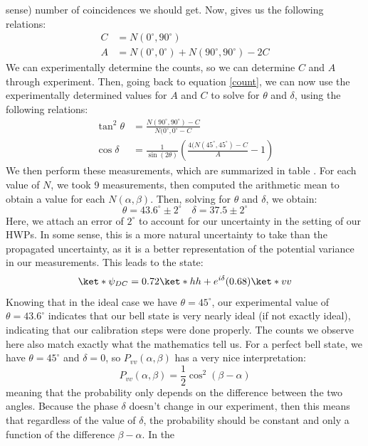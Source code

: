 \documentclass[10pt]{article}
\begin{document}
	sense) number of coincidences we should get. Now, \cite{dehlinger} gives us the following relations:
	\begin{align*}
		C &= N(0^{\circ}, 90^{\circ}) \\ 
		A &= N(0^{\circ}, 0^{\circ}) + N(90^{\circ}, 90^{\circ}) - 2C 
	\end{align*}
	We can experimentally determine the counts, so we can determine \( C \) and \( A \) through experiment.
	Then, going back to equation \ref{count}, we can now use the experimentally determined values for \( A \)
	and \( C \) to solve for \( \theta \) and \( \delta \), using the following relations:
	\begin{align*}
		\tan^2 \theta &= \frac{N(90^{\circ}, 90^{\circ}) - C}{N(0^{\circ}, 0 ^{\circ} - C}\\
		\cos \delta &= \frac{1}{\sin(2 \theta)}\left( \frac{4(N(45^{\circ}, 45^{\circ}) - C}{A} - 1 \right) 
	\end{align*}
	We then perform these measurements, which are summarized in table \cite{dehlinger}. For each value of \( N \), we
	took 9 measurements, then computed the arithmetic mean to obtain a value for each \( N(\alpha, \beta) \).
	Then, solving for \( \theta \) and \( \delta \), we obtain:
	\[
		\theta = 43.6^{\circ} \pm 2^{\circ} \quad \delta = 37.5 \pm 2^{\circ}
	\]
	Here, we attach an error of \( 2^{\circ} \) to account for our uncertainty in the setting of our HWPs.
	In some sense, this is a more natural uncertainty to take than the propagated uncertainty, as it is a
	better representation of the potential variance in our measurements. 
	This leads to the state:
	\[
		\ket*{\psi_{DC}} = 0.72 \ket*{hh} + e^{i \delta} (0.68) \ket*{vv}
	\]
	Knowing that in the ideal case we have \( \theta = 45^{\circ} \), our experimental value of \( \theta =
	43.6^{\circ} \) indicates that our bell state is very nearly ideal (if not exactly ideal), 
	indicating that our calibration steps were done properly. The counts we observe here also match exactly
	what the mathematics tell us. For a perfect bell state, we have \( \theta = 45^{\circ} \) and \( \delta = 0 \), 
	so \( P_{vv}(\alpha, \beta) \) has a very nice interpretation:
	\[
		P_{vv}(\alpha, \beta) = \frac{1}{2}\cos^2(\beta - \alpha)
	\]
	meaning that the probability only depends on the difference between the two angles. Because the phase
	\( \delta \) doesn't change in our experiment, then this means that regardless of the value of \( \delta \),
	the probability should be constant and only a function of the difference \( \beta - \alpha \). In the
\end{document}
